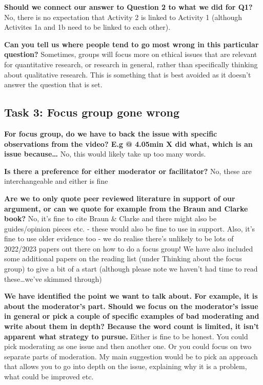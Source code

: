 \documentclass[
  english,
  letterpaper,
  DIV=11,
  numbers=noendperiod]{scrreprt}
\begin{document}
\textbf{Should we connect our answer to Question 2 to what we did for
Q1?} No, there is no expectation that Activity 2 is linked to Activity 1
(although Activites 1a and 1b need to be linked to each other).

\textbf{Can you tell us where people tend to go most wrong in this
particular question?} Sometimes, groups will focus more on ethical
issues that are relevant for quantitative research, or research in
general, rather than specifically thinking about qualitative research.
This is something that is best avoided as it doesn't answer the question
that is set.

\subsection{Task 3: Focus group gone
wrong}\label{task-3-focus-group-gone-wrong-1}

\textbf{For focus group, do we have to back the issue with specific
observations from the video? E.g @ 4.05min X did what, which is an issue
because\ldots{}} No, this would likely take up too many words.

\textbf{Is there a preference for either moderator or facilitator?} No,
these are interchangeable and either is fine

\textbf{Are we to only quote peer reviewed literature in support of our
argument, or can we quote for example from the Braun and Clarke book?}
No, it's fine to cite Braun \& Clarke and there might also be
guides/opinion pieces etc. - these would also be fine to use in support.
Also, it's fine to use older evidence too - we do realise there's
unlikely to be lots of 2022/2023 papers out there on how to do a focus
group! We have also included some additional papers on the reading list
(under Thinking about the focus group) to give a bit of a start
(although please note we haven't had time to read these\ldots we've
skimmed through)

\textbf{We have identified the point we want to talk about. For example,
it is about the moderator's part. Should we focus on the moderator's
issue in general or pick a couple of specific examples of bad moderating
and write about them in depth? Because the word count is limited, it
isn't apparent what strategy to pursue.} Either is fine to be honest.
You could pick moderating as one issue and then another one. Or you
could focus on two separate parts of moderation. My main suggestion
would be to pick an approach that allows you to go into depth on the
issue, explaining why it is a problem, what could be improved etc.
\end{document}

